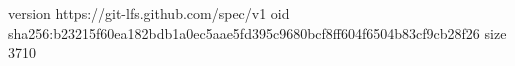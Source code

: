 version https://git-lfs.github.com/spec/v1
oid sha256:b23215f60ea182bdb1a0ec5aae5fd395c9680bcf8ff604f6504b83cf9cb28f26
size 3710
